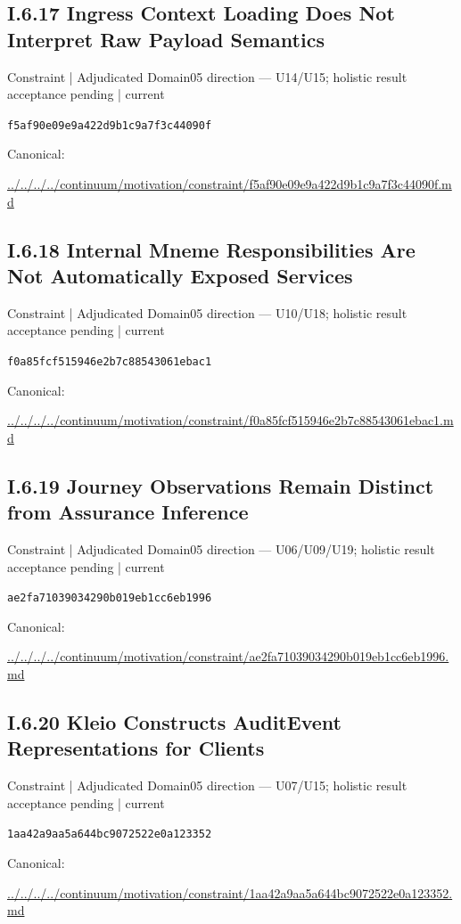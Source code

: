 \documentclass[10pt,a4paper]{article}
\begin{document}
\subsection*{I.6.17 Ingress Context Loading Does Not Interpret Raw Payload Semantics}
\label{element-f5af90e09e9a422d9b1c9a7f3c44090f}
{\small Constraint | Adjudicated Domain05 direction — U14/U15; holistic result acceptance pending | current}\par
\texttt{f5af90e09e9a422d9b1c9a7f3c44090f}\par
Canonical: \par
{\footnotesize\url{../../../../continuum/motivation/constraint/f5af90e09e9a422d9b1c9a7f3c44090f.md}}\par
\subsection*{I.6.18 Internal Mneme Responsibilities Are Not Automatically Exposed Services}
\label{element-f0a85fcf515946e2b7c88543061ebac1}
{\small Constraint | Adjudicated Domain05 direction — U10/U18; holistic result acceptance pending | current}\par
\texttt{f0a85fcf515946e2b7c88543061ebac1}\par
Canonical: \par
{\footnotesize\url{../../../../continuum/motivation/constraint/f0a85fcf515946e2b7c88543061ebac1.md}}\par
\subsection*{I.6.19 Journey Observations Remain Distinct from Assurance Inference}
\label{element-ae2fa71039034290b019eb1cc6eb1996}
{\small Constraint | Adjudicated Domain05 direction — U06/U09/U19; holistic result acceptance pending | current}\par
\texttt{ae2fa71039034290b019eb1cc6eb1996}\par
Canonical: \par
{\footnotesize\url{../../../../continuum/motivation/constraint/ae2fa71039034290b019eb1cc6eb1996.md}}\par
\subsection*{I.6.20 Kleio Constructs AuditEvent Representations for Clients}
\label{element-1aa42a9aa5a644bc9072522e0a123352}
{\small Constraint | Adjudicated Domain05 direction — U07/U15; holistic result acceptance pending | current}\par
\texttt{1aa42a9aa5a644bc9072522e0a123352}\par
Canonical: \par
{\footnotesize\url{../../../../continuum/motivation/constraint/1aa42a9aa5a644bc9072522e0a123352.md}}\par
\end{document}
